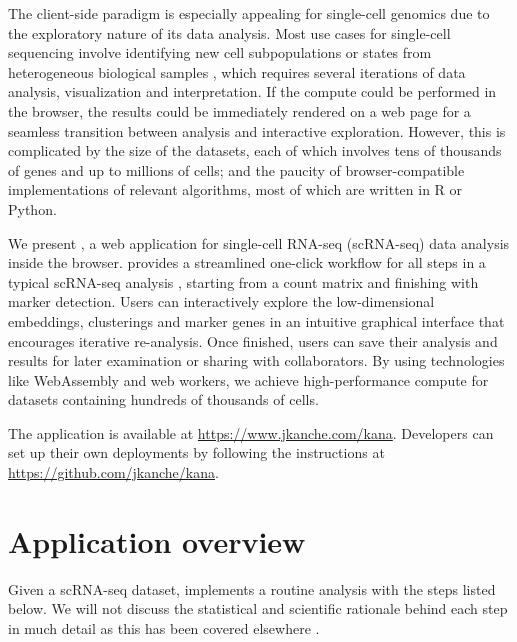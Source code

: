 \documentclass{article}
\begin{document}
The client-side paradigm is especially appealing for single-cell genomics due to the exploratory nature of its data analysis.
Most use cases for single-cell sequencing involve identifying new cell subpopulations or states from heterogeneous biological samples \cite{stegle2015computational},
which requires several iterations of data analysis, visualization and interpretation.
If the compute could be performed in the browser, the results could be immediately rendered on a web page for a seamless transition between analysis and interactive exploration.
However, this is complicated by the size of the datasets, each of which involves tens of thousands of genes and up to millions of cells;
and the paucity of browser-compatible implementations of relevant algorithms, most of which are written in R or Python.

We present , a web application for single-cell RNA-seq (scRNA-seq) data analysis inside the browser.
 provides a streamlined one-click workflow for all steps in a typical scRNA-seq analysis \cite{amezquita2020orchestrating}, 
starting from a count matrix and finishing with marker detection.
Users can interactively explore the low-dimensional embeddings, clusterings and marker genes in an intuitive graphical interface that encourages iterative re-analysis.
Once finished, users can save their analysis and results for later examination or sharing with collaborators.
By using technologies like WebAssembly and web workers, we achieve high-performance compute for datasets containing hundreds of thousands of cells.

The  application is available at \url{https://www.jkanche.com/kana}.
Developers can set up their own deployments by following the instructions at \url{https://github.com/jkanche/kana}.

\section{Application overview}

Given a scRNA-seq dataset,  implements a routine analysis with the steps listed below.
We will not discuss the statistical and scientific rationale behind each step in much detail as this has been covered elsewhere \cite{oscabook}.
\end{document}
